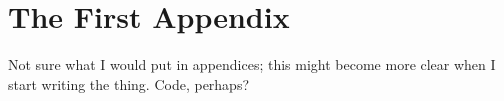 \chapter{The First Appendix}

Not sure what I would put in appendices; this might become more clear when I start writing the thing. Code, perhaps?